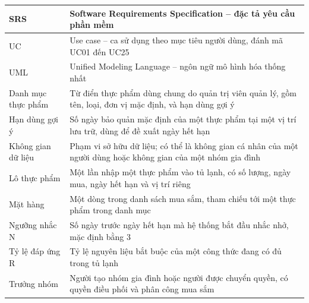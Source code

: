 {\begin{longtable}{|L{3.6cm}|L{\dimexpr{}\arrayrulewidth-3.6cm\relax}|}
SRS & Software Requirements Specification – đặc tả yêu cầu phần mềm\\ \hline
UC & Use case – ca sử dụng theo mục tiêu người dùng, đánh mã UC01 đến UC25\\ \hline
UML & Unified Modeling Language – ngôn ngữ mô hình hóa thống nhất\\ \hline
Danh mục thực phẩm & Từ điển thực phẩm dùng chung do quản trị viên quản lý, gồm tên, loại, đơn vị mặc định, và hạn dùng gợi ý\\ \hline
Hạn dùng gợi ý & Số ngày bảo quản mặc định của một thực phẩm tại một vị trí lưu trữ, dùng để đề xuất ngày hết hạn\\ \hline
Không gian dữ liệu & Phạm vi sở hữu dữ liệu; có thể là không gian cá nhân của một người dùng hoặc không gian của một nhóm gia đình\\ \hline
Lô thực phẩm & Một lần nhập một thực phẩm vào tủ lạnh, có số lượng, ngày mua, ngày hết hạn và vị trí riêng\\ \hline
Mặt hàng & Một dòng trong danh sách mua sắm, tham chiếu tới một thực phẩm trong danh mục\\ \hline
Ngưỡng nhắc N & Số ngày trước ngày hết hạn mà hệ thống bắt đầu nhắc nhở, mặc định bằng 3\\ \hline
Tỷ lệ đáp ứng R & Tỷ lệ nguyên liệu bắt buộc của một công thức đang có đủ trong tủ lạnh\\ \hline
Trưởng nhóm & Người tạo nhóm gia đình hoặc người được chuyển quyền, có quyền điều phối và phân công mua sắm\\ \hline
\end{longtable}
}
